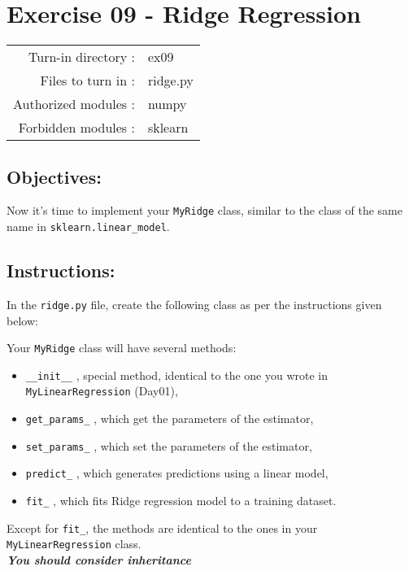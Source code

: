 \documentclass[]{article}
\begin{document}
\hypertarget{exercise-09---ridge-regression-1}{%
\section{Exercise 09 - Ridge
Regression}\label{exercise-09---ridge-regression-1}}

\begin{longtable}[]{@{}rl@{}}
\toprule
\endhead
Turn-in directory : & ex09\tabularnewline
Files to turn in : & ridge.py\tabularnewline
Authorized modules : & numpy\tabularnewline
Forbidden modules : & sklearn\tabularnewline
\bottomrule
\end{longtable}

\hypertarget{objectives-8}{%
\subsection{Objectives:}\label{objectives-8}}

Now it's time to implement your \texttt{MyRidge} class, similar to the
class of the same name in \texttt{sklearn.linear\_model}.

\hypertarget{instructions-8}{%
\subsection{Instructions:}\label{instructions-8}}

In the \texttt{ridge.py} file, create the following class as per the
instructions given below:

Your \texttt{MyRidge} class will have several methods:

\begin{itemize}
\item
  \texttt{\_\_init\_\_} , special method, identical to the one you wrote
  in \texttt{MyLinearRegression} (Day01),
\item
  \texttt{get\_params\_} , which get the parameters of the estimator,
\item
  \texttt{set\_params\_} , which set the parameters of the estimator,
\item
  \texttt{predict\_} , which generates predictions using a linear model,
\item
  \texttt{fit\_} , which fits Ridge regression model to a training
  dataset.
\end{itemize}

Except for \texttt{fit\_}, the methods are identical to the ones in your
\texttt{MyLinearRegression} class.\\
\textbf{\emph{You should consider inheritance}}
\end{document}
